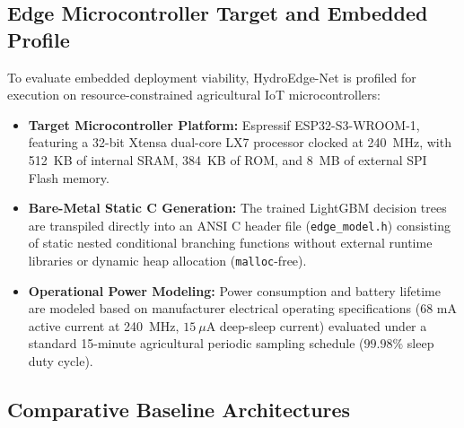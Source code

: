 \subsection{Edge Microcontroller Target and Embedded Profile}

To evaluate embedded deployment viability, HydroEdge-Net is profiled for execution on resource-constrained agricultural IoT microcontrollers:
\begin{itemize}
    \item \textbf{Target Microcontroller Platform:} Espressif ESP32-S3-WROOM-1, featuring a 32-bit Xtensa dual-core LX7 processor clocked at 240~MHz, with 512~KB of internal SRAM, 384~KB of ROM, and 8~MB of external SPI Flash memory.
    \item \textbf{Bare-Metal Static C Generation:} The trained LightGBM decision trees are transpiled directly into an ANSI C header file (\texttt{edge\_model.h}) consisting of static nested conditional branching functions without external runtime libraries or dynamic heap allocation (\texttt{malloc}-free).
    \item \textbf{Operational Power Modeling:} Power consumption and battery lifetime are modeled based on manufacturer electrical operating specifications ($68\text{ mA}$ active current at 240~MHz, $15\ \mu\text{A}$ deep-sleep current) evaluated under a standard 15-minute agricultural periodic sampling schedule ($99.98\%$ sleep duty cycle).
\end{itemize}

\subsection{Comparative Baseline Architectures}

